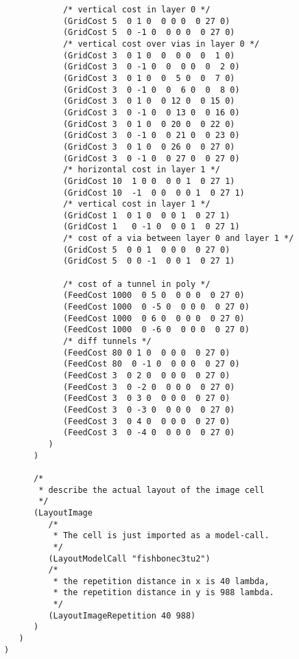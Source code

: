 {\begin{verbatim}
            /* vertical cost in layer 0 */
            (GridCost 5  0 1 0  0 0 0  0 27 0) 
            (GridCost 5  0 -1 0  0 0 0  0 27 0)  
            /* vertical cost over vias in layer 0 */
            (GridCost 3  0 1 0  0  0 0  0  1 0) 
            (GridCost 3  0 -1 0  0  0 0  0  2 0)
            (GridCost 3  0 1 0  0  5 0  0  7 0) 
            (GridCost 3  0 -1 0  0  6 0  0  8 0)
            (GridCost 3  0 1 0  0 12 0  0 15 0) 
            (GridCost 3  0 -1 0  0 13 0  0 16 0)
            (GridCost 3  0 1 0  0 20 0  0 22 0)
            (GridCost 3  0 -1 0  0 21 0  0 23 0)
            (GridCost 3  0 1 0  0 26 0  0 27 0)
            (GridCost 3  0 -1 0  0 27 0  0 27 0)
            /* horizontal cost in layer 1 */
            (GridCost 10  1 0 0  0 0 1  0 27 1) 
            (GridCost 10  -1  0 0  0 0 1  0 27 1) 
            /* vertical cost in layer 1 */
            (GridCost 1  0 1 0  0 0 1  0 27 1)  
            (GridCost 1   0 -1 0  0 0 1  0 27 1)
            /* cost of a via between layer 0 and layer 1 */
            (GridCost 5  0 0 1  0 0 0  0 27 0) 
            (GridCost 5  0 0 -1  0 0 1  0 27 1)

            /* cost of a tunnel in poly */
            (FeedCost 1000  0 5 0  0 0 0  0 27 0) 
            (FeedCost 1000  0 -5 0  0 0 0  0 27 0)
            (FeedCost 1000  0 6 0  0 0 0  0 27 0) 
            (FeedCost 1000  0 -6 0  0 0 0  0 27 0)
            /* diff tunnels */
            (FeedCost 80 0 1 0  0 0 0  0 27 0) 
            (FeedCost 80  0 -1 0  0 0 0  0 27 0)
            (FeedCost 3  0 2 0  0 0 0  0 27 0) 
            (FeedCost 3  0 -2 0  0 0 0  0 27 0)
            (FeedCost 3  0 3 0  0 0 0  0 27 0) 
            (FeedCost 3  0 -3 0  0 0 0  0 27 0)
            (FeedCost 3  0 4 0  0 0 0  0 27 0) 
            (FeedCost 3  0 -4 0  0 0 0  0 27 0)
         )
      )

      /*
       * describe the actual layout of the image cell
       */
      (LayoutImage      
         /*
          * The cell is just imported as a model-call.
          */
         (LayoutModelCall "fishbonec3tu2")
         /* 
          * the repetition distance in x is 40 lambda,
          * the repetition distance in y is 988 lambda.
          */
         (LayoutImageRepetition 40 988)
      )
   )
)

\end{verbatim}
}
